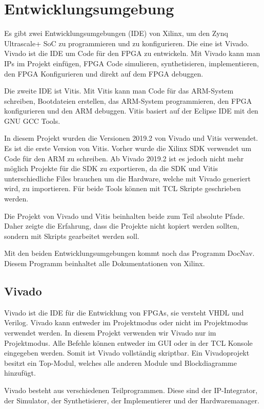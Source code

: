 \section{Entwicklungsumgebung}
Es gibt zwei Entwicklungsumgebungen (IDE) von Xilinx, um den Zynq Ultrascale+ SoC zu programmieren und zu konfigurieren. Die eine ist Vivado. Vivado ist die IDE um Code für den FPGA zu entwickeln. Mit Vivado kann man IPs im Projekt einfügen, FPGA Code simulieren, synthetisieren, implementieren, den FPGA Konfigurieren und direkt auf dem FPGA debuggen.

Die zweite IDE ist Vitis. Mit Vitis kann man Code für das ARM-System schreiben, Bootdateien erstellen, das ARM-System programmieren, den FPGA konfigurieren und den ARM debuggen. Vitis basiert auf der Eclipse IDE mit den GNU GCC Tools.

In diesem Projekt wurden die Versionen 2019.2 von Vivado und Vitis verwendet. Es ist die erste Version von Vitis. Vorher wurde die Xilinx SDK verwendet um Code für den ARM zu schreiben. Ab Vivado 2019.2 ist es jedoch nicht mehr möglich Projekte für die SDK zu exportieren, da die SDK und Vitis unterschiedliche Files brauchen um die Hardware, welche mit Vivado generiert wird, zu importieren. Für beide Tools können mit TCL Skripte geschrieben werden.

Die Projekt von Vivado und Vitis beinhalten beide zum Teil absolute Pfade. Daher zeigte die Erfahrung, dass die Projekte nicht kopiert werden sollten, sondern mit Skripts gearbeitet werden soll. 

Mit den beiden Entwicklungsumgebungen kommt noch das Programm DocNav. Diesem Programm beinhaltet alle Dokumentationen von Xilinx.

\subsection{Vivado}
Vivado ist die IDE für die Entwicklung von FPGAs, sie versteht VHDL und Verilog. Vivado kann entweder im Projektmodus oder nicht im Projektmodus verwendet werden. In diesem Projekt verwenden wir Vivado nur im Projektmodus. Alle Befehle können entweder im GUI oder in der TCL Konsole eingegeben werden. Somit ist Vivado vollständig skriptbar. Ein Vivadoprojekt besitzt ein Top-Modul, welches alle anderen Module und Blockdiagramme hinzufügt.

Vivado besteht aus verschiedenen Teilprogrammen. Diese sind der IP-Integrator, der Simulator, der Synthetisierer, der Implementierer und der Hardwaremanager.


